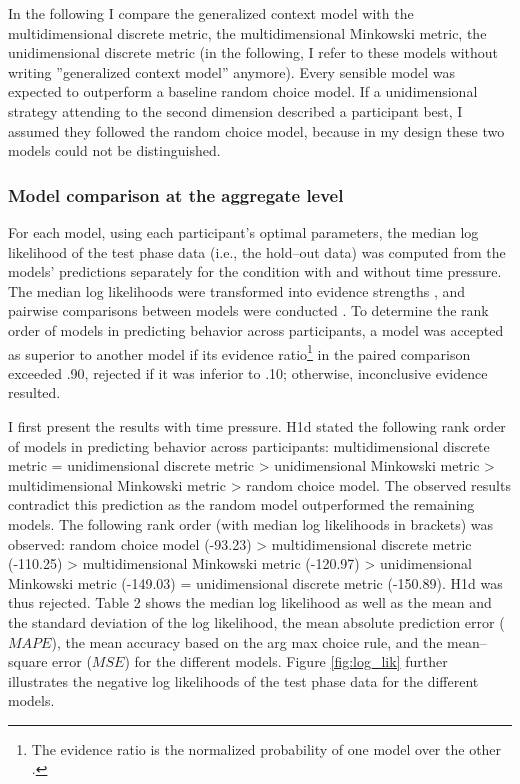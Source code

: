 \documentclass[a4paper,man,natbib]{apa6}
\begin{document}
In the following I compare the generalized context model with the multidimensional discrete metric, the multidimensional Minkowski metric, the unidimensional discrete metric (in the following, I refer to these models without writing ''generalized context model'' anymore). Every sensible model was expected to outperform a baseline random choice model. If a unidimensional strategy attending to the second dimension described a participant best, I assumed they followed the random choice model, because in my design these two models could not be distinguished. 

\subsubsection{Model comparison at the aggregate level} \label{sec:res_agg}
For each model, using each participant's optimal parameters, the median log likelihood of the test phase data (i.e., the hold--out data) was computed from the models' predictions separately for the condition with and without time pressure. The median log likelihoods were transformed into evidence strengths \citep[Akake weights,][]{wagenmakers2004aic}, and pairwise comparisons between models were conducted \citep[as in][p. 194]{wagenmakers2004aic}. To determine the rank order of models in predicting behavior across participants, a model was accepted as superior to another model if its evidence ratio\footnote{The evidence ratio is the normalized probability of one model over the other \citep[see][p. 194]{wagenmakers2004aic}.} in the paired comparison exceeded .90, rejected if it was inferior to .10; otherwise, inconclusive evidence resulted. 

I first present the results with time pressure. H1d stated the following rank order of models in predicting behavior across participants: multidimensional discrete metric = unidimensional discrete metric > unidimensional Minkowski metric > multidimensional Minkowski metric > random choice model. The observed results contradict this prediction as the random model outperformed the remaining models. The following rank order (with median log likelihoods in brackets) was observed: random choice model (-93.23) > multidimensional discrete metric (-110.25) > multidimensional Minkowski metric (-120.97) > unidimensional Minkowski metric (-149.03) = unidimensional discrete metric (-150.89). H1d was thus rejected. Table 2 shows the median log likelihood as well as the mean and the standard deviation of the log likelihood, the mean absolute prediction error ($MAPE$), the mean accuracy based on the arg max choice rule, and the mean--square error ($MSE$) for the different models. Figure \ref{fig:log_lik} further illustrates the negative log likelihoods of the test phase data for the different models. 
\end{document}
